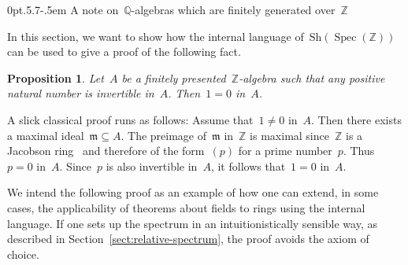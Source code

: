 \documentclass[10pt,reqno,a4paper]{amsbook}
\makeatletter
\theoremstyle{definition}
\theoremstyle{plain}
\newtheorem{prop}[defn]{Proposition}
\theoremstyle{remark}
\newcommand{\ZZ}{\mathbb{Z}}
\newcommand{\QQ}{\mathbb{Q}}
\newcommand{\mmm}{\mathfrak{m}}
\newcommand{\Sh}{\mathrm{Sh}}
\DeclareMathOperator{\Spec}{Spec}
\newcommand{\?}{\,{:}\,}
\renewcommand{\_}{\mathpunct{.}\,}
\newcommand{\stacksproject}[1]{\cite[{\href{http://stacks.math.columbia.edu/tag/#1}{Tag~#1}}]{stacks-project}}
\def\subsection{\@startsection{subsection}{2}%
  {0pt}{.5\linespacing\@plus.7\linespacing}{-.5em}%
  {\normalfont\bfseries}}
\makeatother
\begin{document}
\subsection{A note on~$\QQ$-algebras which are finitely generated over~$\ZZ$}

In this section, we want to show how the internal language of~$\Sh(\Spec(\ZZ))$
can be used to give a proof of the following fact.

\begin{prop}\label{prop:fingen-algebra-q}
Let~$A$ be a finitely presented~$\ZZ$-algebra such that any positive natural
number is invertible in~$A$. Then~$1 = 0$ in~$A$.
\end{prop}

A slick classical proof runs as follows: Assume that~$1 \neq 0$ in~$A$. Then
there exists a maximal ideal~$\mmm \subseteq A$. The preimage of~$\mmm$
in~$\ZZ$ is maximal since~$\ZZ$ is a Jacobson ring~\stacksproject{00GB} and
therefore of the form~$(p)$ for a prime number~$p$. Thus~$p = 0$ in~$A$.
Since~$p$ is also invertible in~$A$, it follows that~$1 = 0$ in~$A$.

We intend the following proof as an example of how one can extend, in some
cases, the applicability of theorems about fields to rings using the internal
language. If one sets up the spectrum in an intuitionistically sensible way, as
described in Section~\ref{sect:relative-spectrum}, the proof avoids the axiom
of choice.
\end{document}
